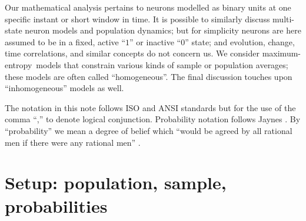 \documentclass{article}
\theoremstyle{remark}
\theoremstyle{innote}
\newcommand*{\citep}{\parencites}
\renewcommand*{\cite}{\citep}
\renewcommand*{\|}{\mathpunct{|}}%
\theoremstyle{simple}
\newcommand*{\me}{maximum-entropy}
\begin{document}

Our mathematical analysis pertains to neurons modelled as binary units at
one specific instant or short window in time. It is possible to similarly
discuss multi-state neuron models and population dynamics; but for
simplicity neurons are here assumed to be in a fixed, active \enquote{$1$}
or inactive \enquote{$0$} state; and evolution, change, time correlations,
and similar concepts do not concern us. We consider \me\ models that
constrain various kinds of sample or population averages; these models are
often called \enquote{homogeneous}. The final discussion touches upon
\enquote{inhomogeneous} models as well.


The notation in this note follows ISO and ANSI standards
\citep{iso1993,ieee1993,nist1995} but for the use of the comma \enquote{,}
to denote logical conjunction. Probability notation follows Jaynes
\citep{jaynes1994_r2003}. By \enquote{probability} we mean a degree of
belief which \enquote{would be agreed by all rational men if there were any
  rational men} \cite{good1966}.

\section{Setup: population, sample, probabilities}
\label{sec:setup}
\end{document}
